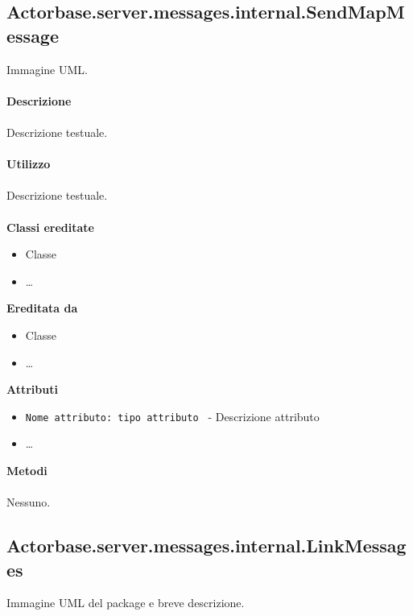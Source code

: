 \documentclass[a4paper]{article}
\begin{document}
	\subsection{Actorbase.server.messages.internal.SendMapMessage}
		Immagine UML.
		\\ \\
		\textbf{Descrizione}
			\\ \\
			Descrizione testuale.
			\\ \\
		\textbf{Utilizzo}
			\\ \\
			Descrizione testuale.
			\\ \\
		\textbf{Classi ereditate}
			\begin{itemize}
				\item Classe
				\item \dots
			\end{itemize}
		\textbf{Ereditata da}
			\begin{itemize}
				\item Classe
				\item \dots
			\end{itemize}
		\textbf{Attributi}
			\begin{itemize}
				\item \texttt{Nome attributo: tipo attributo } - Descrizione attributo
				\item \dots
			\end{itemize}
		\textbf{Metodi}
			\\ \\
			Nessuno.
			
	\subsection{Actorbase.server.messages.internal.LinkMessages}
		Immagine UML del package e breve descrizione.
		
\end{document}
